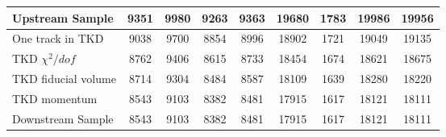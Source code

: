 \begin{landscape}
\begin{table}
\begin{tabular}[pos]{l|cccccccc}
\hline                                            
Upstream Sample                                    &    9351  &    9980  &    9263  &    9363  &   19680  &    1783  &   19986  &   19956  \\
\hline                                            
One track in TKD                                   &    9038  &    9700  &    8854  &    8996  &   18902  &    1721  &   19049  &   19135  \\
TKD $\chi^2/dof$                                   &    8762  &    9406  &    8615  &    8733  &   18454  &    1674  &   18621  &   18675  \\
TKD fiducial volume                                &    8714  &    9304  &    8484  &    8587  &   18109  &    1639  &   18280  &   18220  \\
TKD momentum                                       &    8543  &    9103  &    8382  &    8481  &   17915  &    1617  &   18121  &   18111  \\
\hline                                            
Downstream Sample                                  &    8543  &    9103  &    8382  &    8481  &   17915  &    1617  &   18121  &   18111  \\
\hline                                            

\end{tabular}
\end{table}
\end{landscape}



